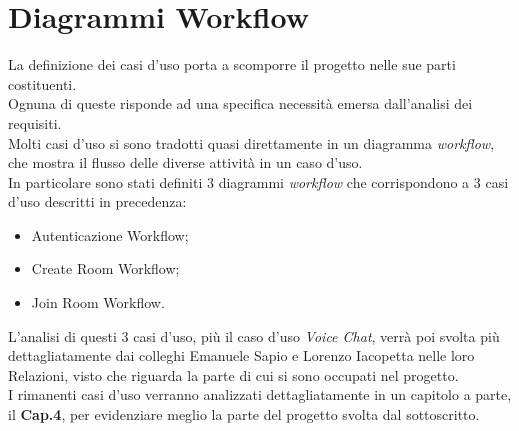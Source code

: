\section{Diagrammi Workflow}
La definizione dei casi d'uso porta a scomporre il progetto nelle sue parti costituenti. \\Ognuna di queste risponde ad una specifica necessità emersa dall'analisi dei requisiti. \\Molti casi d'uso si sono tradotti quasi direttamente in un diagramma \textit{workflow}, che mostra il flusso delle diverse attività in un caso d'uso. \\In particolare sono stati definiti 3 diagrammi \textit{workflow} che corrispondono a 3 casi d'uso descritti in precedenza:
\begin{itemize}
   \item Autenticazione Workflow;
   \item Create Room Workflow;
   \item Join Room Workflow.
\end{itemize}
L'analisi di questi 3 casi d'uso, più il caso d'uso \textit{Voice Chat}, verrà poi svolta più dettagliatamente dai colleghi Emanuele Sapio e Lorenzo Iacopetta nelle loro Relazioni, visto che riguarda la parte di cui si sono occupati nel progetto.
\\I rimanenti casi d'uso verranno analizzati dettagliatamente in un capitolo a parte, il \textbf{Cap.4}, per evidenziare meglio la parte del progetto svolta dal sottoscritto.

